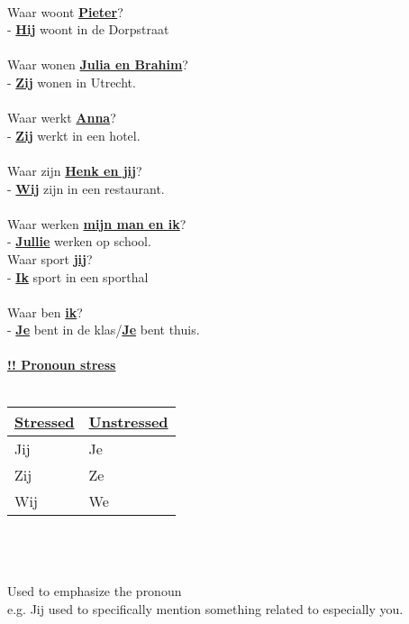 \documentclass[a4paper,14pt]{extarticle}
\newcommand{\attention}[1]{\underline{\textbf{!! #1}}}
\newcommand{\emp}[1]{\underline{\textbf{#1}}}
\begin{document}
\begin{paracol}{2}
\hfill \\
Waar woont \emp{Pieter}? \\
- \emp{Hij} woont in de Dorpstraat \\ \\
Waar wonen \emp{Julia en Brahim}? \\
- \emp{Zij} wonen in Utrecht. \\ \\
Waar werkt \emp{Anna}? \\
- \emp{Zij} werkt in een hotel. \\ \\
Waar zijn \emp{Henk en jij}? \\
- \emp{Wij} zijn in een restaurant. \\ \\
Waar werken \emp{mijn man en ik}? \\
- \emp{Jullie} werken op school.
\switchcolumn
\hfill \\
Waar sport \emp{jij}? \\
- \emp{Ik} sport in een sporthal \\ \\
Waar ben \emp{ik}? \\
- \emp{Je} bent in de klas/\emp{Je} bent thuis. \\ \\
\attention{Pronoun stress} \\ \\
\begin{tabularx}{200pt}{ p{100pt} p{100pt} }
\hline
\emp{Stressed} & \emp{Unstressed} \\
\hline
Jij & Je \\
Zij & Ze \\
Wij & We 
\end{tabularx} \\ \\ \\
Used to emphasize the pronoun \\
e.g.
Jij used to specifically mention something related to especially you.
\end{paracol}
\newpage
\end{document}
